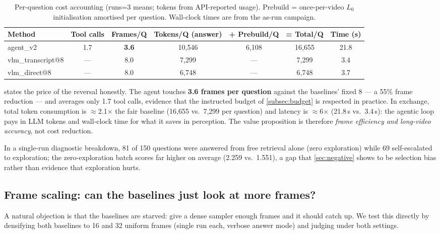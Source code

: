 \begin{table}[t]
  \centering
  \small
  \caption{Per-question cost accounting (runs=3 means; tokens from API-reported
  usage). Prebuild = once-per-video $L_0$ initialisation amortised per question.
  Wall-clock times are from the as-run campaign.}
  \label{tab:cost}
  \footnotesize
  \setlength{\tabcolsep}{4pt}
  \begin{tabular}{@{}lcccccc@{}}
    \toprule
    Method & Tool calls & Frames/Q & Tokens/Q (answer) & + Prebuild/Q & = Total/Q & Time (s) \\
    \midrule
    agent\_v2 & 1.7 & \textbf{3.6} & 10{,}546 & 6{,}108 & 16{,}655 & 21.8 \\
    vlm\_transcript@8 & --- & 8.0 & 7{,}299 & --- & 7{,}299 & 3.4 \\
    vlm\_direct@8 & --- & 8.0 & 6{,}748 & --- & 6{,}748 & 3.7 \\
    \bottomrule
  \end{tabular}
\end{table}

 states the price of the reversal honestly. The agent touches
\textbf{3.6 frames per question} against the baselines' fixed 8 --- a 55\% frame
reduction --- and averages only 1.7 tool calls, evidence that the instructed budget
of \cref{subsec:budget} is respected in practice. In exchange, total token
consumption is $\approx$2.1$\times$ the fair baseline (16{,}655 vs.\ 7{,}299 per
question) and latency is $\approx$6$\times$ (21.8\,s vs.\ 3.4\,s): the agentic loop
pays in LLM tokens and wall-clock time for what it saves in perception. The value
proposition is therefore \emph{frame efficiency and long-video accuracy}, not cost
reduction.

In a single-run diagnostic breakdown, 81 of 150 questions were answered from free
retrieval alone (zero exploration) while 69 self-escalated to exploration; the
zero-exploration batch scores far higher on average (2.259 vs.\ 1.551), a gap that
\cref{sec:negative} shows to be selection bias rather than evidence that
exploration hurts.

\subsection{Frame scaling: can the baselines just look at more frames?}
\label{subsec:framescaling}

A natural objection is that the baselines are starved: give a dense sampler enough
frames and it should catch up. We test this directly by densifying both baselines
to 16 and 32 uniform frames (single run each, verbose answer mode) and judging
under both settings.

